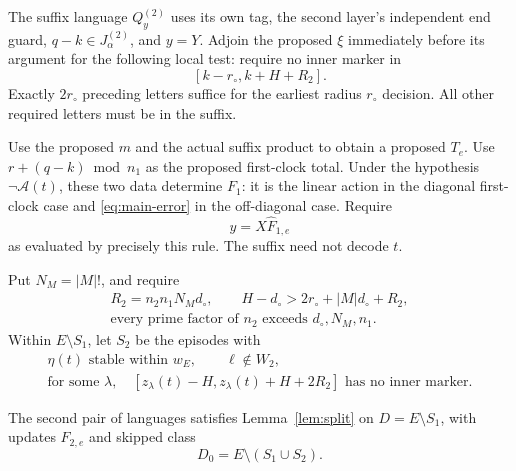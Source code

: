 The suffix language \(Q_y^{(2)}\) uses its own tag, the second layer's independent
end guard, \(q-k\in J^{(2)}_\alpha\), and \(y=Y\).
Adjoin the proposed \(\xi\) immediately before its argument for the following
local test: require no inner marker in
\begin{equation}\label{eq:periodic-suffix-window}
                          [k-r_\circ,k+H+R_2].
\end{equation}
Exactly \(2r_\circ\) preceding letters suffice for the earliest radius
\(r_\circ\) decision. All other required letters must be in the suffix.

Use the proposed \(m\) and the actual suffix product to obtain a proposed
\(T_e\). Use \(r+(q-k)\bmod n_1\) as the proposed first-clock total.
Under the hypothesis \(\neg\mathcal A(t)\), these two data determine \(F_1\):
it is the linear action in the diagonal first-clock case and
\eqref{eq:main-error} in the off-diagonal case. Require
\[
                             y=X\widehat F_{1,e}
\]
as evaluated by precisely this rule. The suffix need not decode \(t\).

Put \(N_M=|M|!\), and require
\begin{equation}\label{eq:periodic-parameters}
\begin{gathered}
 R_2=n_2n_1N_Md_\circ,\qquad
 H-d_\circ>2r_\circ+|M|d_\circ+R_2,\\
 \text{every prime factor of }n_2\text{ exceeds }d_\circ,N_M,n_1.
\end{gathered}
\end{equation}
Within \(E\setminus S_1\), let \(S_2\) be the episodes with
\begin{equation}\label{eq:S2}
\begin{gathered}
 \eta(t)\text{ stable within }w_E,\qquad \ell\notin W_2,\\
 \text{for some }\lambda,\quad
 [z_\lambda(t)-H,z_\lambda(t)+H+2R_2]\text{ has no inner marker}.
\end{gathered}
\end{equation}

\begin{lemma}\label{lem:periodic-split}
The second pair of languages satisfies Lemma~\ref{lem:split} on
\(D=E\setminus S_1\), with updates \(F_{2,e}\) and skipped class
\[
                        D_0=E\setminus(S_1\cup S_2).
\]
\end{lemma}

